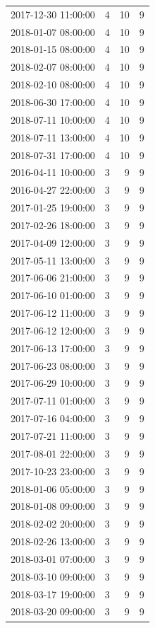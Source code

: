 \begin{tabular}{lrrr}
2017-12-30 11:00:00 & 4 & 10 & 9 \\
2018-01-07 08:00:00 & 4 & 10 & 9 \\
2018-01-15 08:00:00 & 4 & 10 & 9 \\
2018-02-07 08:00:00 & 4 & 10 & 9 \\
2018-02-10 08:00:00 & 4 & 10 & 9 \\
2018-06-30 17:00:00 & 4 & 10 & 9 \\
2018-07-11 10:00:00 & 4 & 10 & 9 \\
2018-07-11 13:00:00 & 4 & 10 & 9 \\
2018-07-31 17:00:00 & 4 & 10 & 9 \\
2016-04-11 10:00:00 & 3 & 9 & 9 \\
2016-04-27 22:00:00 & 3 & 9 & 9 \\
2017-01-25 19:00:00 & 3 & 9 & 9 \\
2017-02-26 18:00:00 & 3 & 9 & 9 \\
2017-04-09 12:00:00 & 3 & 9 & 9 \\
2017-05-11 13:00:00 & 3 & 9 & 9 \\
2017-06-06 21:00:00 & 3 & 9 & 9 \\
2017-06-10 01:00:00 & 3 & 9 & 9 \\
2017-06-12 11:00:00 & 3 & 9 & 9 \\
2017-06-12 12:00:00 & 3 & 9 & 9 \\
2017-06-13 17:00:00 & 3 & 9 & 9 \\
2017-06-23 08:00:00 & 3 & 9 & 9 \\
2017-06-29 10:00:00 & 3 & 9 & 9 \\
2017-07-11 01:00:00 & 3 & 9 & 9 \\
2017-07-16 04:00:00 & 3 & 9 & 9 \\
2017-07-21 11:00:00 & 3 & 9 & 9 \\
2017-08-01 22:00:00 & 3 & 9 & 9 \\
2017-10-23 23:00:00 & 3 & 9 & 9 \\
2018-01-06 05:00:00 & 3 & 9 & 9 \\
2018-01-08 09:00:00 & 3 & 9 & 9 \\
2018-02-02 20:00:00 & 3 & 9 & 9 \\
2018-02-26 13:00:00 & 3 & 9 & 9 \\
2018-03-01 07:00:00 & 3 & 9 & 9 \\
2018-03-10 09:00:00 & 3 & 9 & 9 \\
2018-03-17 19:00:00 & 3 & 9 & 9 \\
2018-03-20 09:00:00 & 3 & 9 & 9 \\

\end{tabular}
